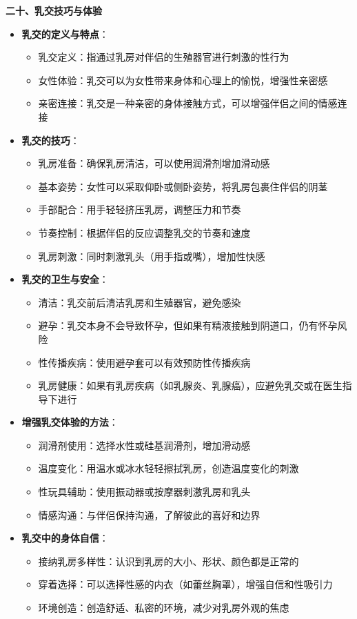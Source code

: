 \documentclass[12pt,UTF8]{ctexbook}
\begin{document}
  \textbf{二十、乳交技巧与体验}
  \begin{itemize}
  \item \textbf{乳交的定义与特点}：
    \begin{itemize}
    \item 乳交定义：指通过乳房对伴侣的生殖器官进行刺激的性行为
    \item 女性体验：乳交可以为女性带来身体和心理上的愉悦，增强性亲密感
    \item 亲密连接：乳交是一种亲密的身体接触方式，可以增强伴侣之间的情感连接
    \end{itemize}
  \item \textbf{乳交的技巧}：
    \begin{itemize}
    \item 乳房准备：确保乳房清洁，可以使用润滑剂增加滑动感
    \item 基本姿势：女性可以采取仰卧或侧卧姿势，将乳房包裹住伴侣的阴茎
    \item 手部配合：用手轻轻挤压乳房，调整压力和节奏
    \item 节奏控制：根据伴侣的反应调整乳交的节奏和速度
    \item 乳房刺激：同时刺激乳头（用手指或嘴），增加性快感
    \end{itemize}
  \item \textbf{乳交的卫生与安全}：
    \begin{itemize}
    \item 清洁：乳交前后清洁乳房和生殖器官，避免感染
    \item 避孕：乳交本身不会导致怀孕，但如果有精液接触到阴道口，仍有怀孕风险
    \item 性传播疾病：使用避孕套可以有效预防性传播疾病
    \item 乳房健康：如果有乳房疾病（如乳腺炎、乳腺癌），应避免乳交或在医生指导下进行
    \end{itemize}
  \item \textbf{增强乳交体验的方法}：
    \begin{itemize}
    \item 润滑剂使用：选择水性或硅基润滑剂，增加滑动感
    \item 温度变化：用温水或冰水轻轻擦拭乳房，创造温度变化的刺激
    \item 性玩具辅助：使用振动器或按摩器刺激乳房和乳头
    \item 情感沟通：与伴侣保持沟通，了解彼此的喜好和边界
    \end{itemize}
  \item \textbf{乳交中的身体自信}：
    \begin{itemize}
    \item 接纳乳房多样性：认识到乳房的大小、形状、颜色都是正常的
    \item 穿着选择：可以选择性感的内衣（如蕾丝胸罩），增强自信和性吸引力
    \item 环境创造：创造舒适、私密的环境，减少对乳房外观的焦虑
    \end{itemize}
  \end{itemize}
\end{document}
